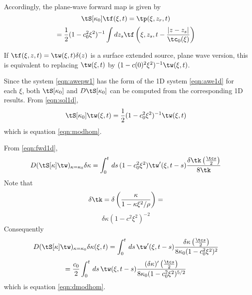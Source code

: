 Accordingly, the plane-wave forward map is given by
\[
  \tS[\kappa_0]\tf(\xi,t) =\tp(\xi,z_r,t)
\]
\begin{equation}
\label{eqn:fwdpw1}
= \frac{1}{2}(1-c_0^2\xi^2)^{-1}\int dz_s \tf\left(\xi,z_s,t -
  \frac{|z-z_s|}{\tc_0(\xi)}\right)
\end{equation}

If $\tf(\xi,z,t)=\tw(\xi,t)\delta(z)$ is a surface
extended source, plane wave version, this is equivalent to replacing
$\tw(\xi,t)$ by $(1-c(0)^2\xi^2)^{-1}\tw(\xi,t)$.

Since the system \ref{eqn:awepw1} has the form of the 1D system
\ref{eqn:awe1d} for each $\xi $, both $\tS[\kappa_0] $ and
$D\tS[\kappa_0]$ can be computed from the corresponding 1D
results. From \ref{eqn:sol1d},
\[
\tS[\kappa_0]\tw(\xi,t)=\frac{1}{2}(1-c_0^2\xi^2)^{-1}\tw(\xi,t)
\]
which is equation \ref{eqn:modhom}.

From \ref{eqn:fwd1d},
\[
D(\tS[\kappa]\tw)_{\kappa=\kappa_0}\delta \kappa = \int_0^t\,ds\,(1-c_0^2\xi^2)\tw'(\xi,t-s)\frac{\delta 
  \tk \left(\frac{\tc s}{2}\right)}{8\tk} 
\]
Note that 
\[
\delta \tk = \delta \left(\frac{\kappa}{1-\kappa \xi^2/\rho}\right) = 
\]
\[
\delta \kappa (1-c^2\xi^2)^{-2}
\]
Consequently 
\[
D(\tS[\kappa]\tw)_{\kappa=\kappa_0}\delta \kappa(\xi,t) =
\int_0^t\,ds\,\tw'(\xi,t-s)\frac{\delta \kappa  \left(\frac{\tc 
      s}{2}\right)}{8\kappa_0 (1-c_0^2\xi^2)^2} 
\]
\[
= \frac{c_0}{2}\int_0^t\,ds\,\tw(\xi,t-s)\frac{(\delta \kappa)'  \left(\frac{\tc 
      s}{2}\right)}{8\kappa_0 (1-c_0^2\xi^2)^{5/2}} 
\]
which is equation \ref{eqn:dmodhom}.

